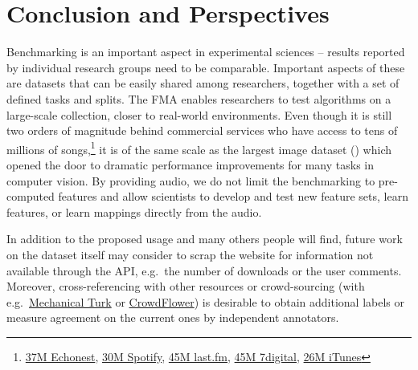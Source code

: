 \documentclass{article}
\begin{document}
\section{Conclusion and Perspectives}


Benchmarking is an important aspect in experimental sciences -- results reported by individual research groups need to be comparable. Important aspects of these are datasets that can be easily shared among researchers, together with a set of defined tasks and splits. The FMA enables researchers to test algorithms on a large-scale collection, closer to real-world environments. Even though it is still two orders of magnitude behind commercial services who have access to tens of millions of songs,\footnote{\href{http://the.echonest.com}{37M Echonest}, \href{https://en.wikipedia.org/wiki/Spotify}{30M Spotify}, \href{http://www.skilledtests.com/wiki/Last.fm_statistics}{45M last.fm}, \href{http://bupz.com/best-websites-to-buy-musics}{45M 7digital}, \href{https://www.apple.com/pr/library/2013/02/06iTunes-Store-Sets-New-Record-with-25-Billion-Songs-Sold.html}{26M iTunes}} it is of the same scale as the largest image dataset () which opened the door to dramatic performance improvements for many tasks in computer vision.
By providing audio, we do not limit the benchmarking to pre-computed features and allow scientists to develop and test new feature sets, learn features, or learn mappings directly from the audio.


In addition to the proposed usage and many others people will find, future work on the dataset itself may consider to scrap the website for information not available through the API, e.g.\ the number of downloads or the user comments. Moreover, cross-referencing with other resources or crowd-sourcing (with e.g.\ \href{https://www.mturk.com}{Mechanical Turk} or \href{https://www.crowdflower.com/}{CrowdFlower}) is desirable to obtain additional labels or measure agreement on the current ones by independent annotators.
\end{document}
